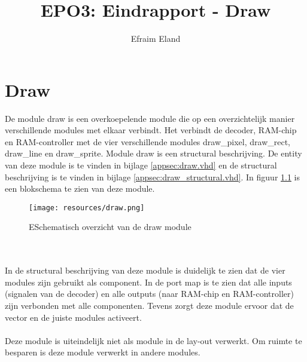 \documentclass{scrartcl} %
\author{Efraim Eland}
\title{EPO3: Eindrapport - Draw}
\begin{document}
\chapter{Draw}
\label{ch:draw}

De module draw is een overkoepelende module die op een overzichtelijk manier verschillende modules met elkaar verbindt. Het verbindt de decoder, RAM-chip en RAM-controller met de vier verschillende modules draw\_pixel, draw\_rect, draw\_line en draw\_sprite. Module draw is een structural beschrijving. De entity van deze module is te vinden in bijlage \ref{appsec:draw.vhd} en de structural beschrijving is te vinden in bijlage \ref{appsec:draw_structural.vhd}. In figuur \ref{fig:draw} is een blokschema te zien van deze module.

\begin{figure}[H]
	\centering
	\texttt{[image: resources/draw.png]}
	\caption{ESchematisch overzicht van de draw module}
	\label{fig:draw}
\end{figure}
\\\\
In de structural beschrijving van deze module is duidelijk te zien dat de vier modules zijn gebruikt als component. In de port map is te zien dat alle inputs (signalen van de decoder) en alle outputs (naar RAM-chip en RAM-controller) zijn verbonden met alle componenten. Tevens zorgt deze module ervoor dat de vector en de juiste modules activeert.
\\\\
Deze module is uiteindelijk niet als module in de lay-out verwerkt. Om ruimte te besparen is deze module verwerkt in andere modules.
\end{document}
